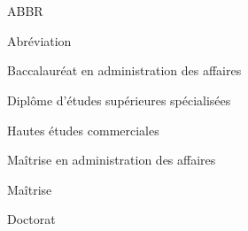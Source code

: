 \chapter*{\HECtdmAbreviations}

\begin{HECabbreviations}{ABBR}
\item[ABBR] Abr\'{e}viation
\item[BAA] Baccalaur\'{e}at en administration des affaires
\item[DESS] Dipl\^{o}me d'\'{e}tudes sup\'{e}rieures sp\'{e}cialis\'{e}es
\item[HEC] Hautes \'{e}tudes commerciales
\item[MBA] Ma\^{i}trise en administration des affaires
\item[MSc] Ma\^{i}trise
\item[PhD] Doctorat
\end{HECabbreviations}
